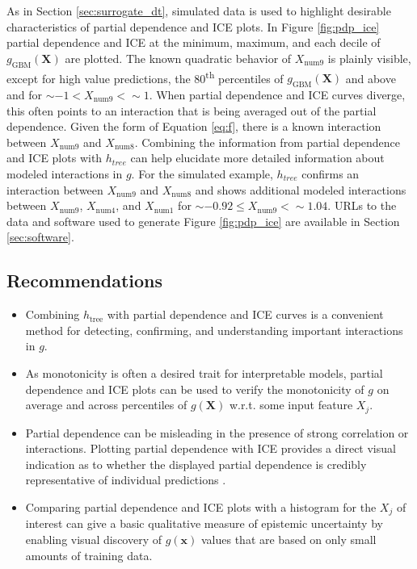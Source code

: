 \documentclass[sigconf]{acmart}
\begin{document}
As in Section \ref{sec:surrogate_dt}, simulated data is used to highlight desirable characteristics of partial dependence and ICE plots. In Figure \ref{fig:pdp_ice} partial dependence and ICE at the minimum, maximum, and each decile of $g_{\text{GBM}}(\mathbf{X})$ are plotted. The known quadratic behavior of $X_{\text{num}9}$ is plainly visible, except for high value predictions, the 80\textsuperscript{th} percentiles of $g_{\text{GBM}}(\mathbf{X})$ and above and for $\sim-1 < X_{\text{num}9} < \sim1$. When partial dependence and ICE curves diverge, this often points to an interaction that is being averaged out of the partial dependence. Given the form of Equation \ref{eq:f}, there is a known interaction between $X_{\text{num}9}$ and $X_{\text{num}8}$. Combining the information from partial dependence and ICE plots with $h_{tree}$ can help elucidate more detailed information about modeled interactions in $g$. For the simulated example, $h_{tree}$ confirms an interaction between $X_{\text{num}9}$ and $X_{\text{num}8}$ and shows additional modeled interactions between $X_{\text{num}9}$, $X_{\text{num}4}$, and $X_{\text{num}1}$ for $\sim -0.92 \le X_{\text{num}9} <  \sim 1.04.$ URLs to the data and software used to generate Figure \ref{fig:pdp_ice} are available in Section \ref{sec:software}.

\subsection{Recommendations}

\begin{itemize}

\item Combining $h_{\text{tree}}$ with partial dependence and ICE curves is a convenient method for detecting, confirming, and understanding important interactions in $g$.

\item As monotonicity is often a desired trait for interpretable models, partial dependence and ICE plots can be used to verify the monotonicity of $g$ on average and across percentiles of $g(\mathbf{X})$ w.r.t. some input feature $X_j$.

\item Partial dependence can be misleading in the presence of strong correlation or interactions. Plotting partial dependence with ICE provides a direct visual indication as to whether the displayed partial dependence is credibly representative of individual predictions \cite{ice_plots}.

\item Comparing partial dependence and ICE plots with a histogram for the $X_j$ of interest can give a basic qualitative measure of epistemic uncertainty by enabling visual discovery of $g(\mathbf{x})$ values that are based on only small amounts of training data.

\end{itemize}
\end{document}
